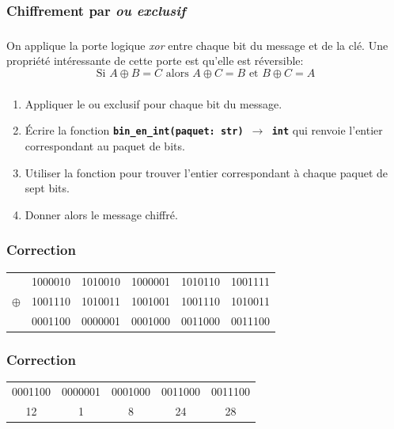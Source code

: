 \documentclass[svgnames,11pt]{beamer}
\begin{document}
\subsubsection{Chiffrement par \emph{ou exclusif}}
\begin{frame}
    \frametitle{}
    On applique la porte logique \emph{xor} entre chaque bit du message et de la clé. Une propriété intéressante de cette porte est qu'elle est réversible:
    $$\mbox{Si }A\oplus B = C \mbox{ alors } A\oplus C=B \mbox{ et }B\oplus C=A$$
    

\end{frame}

\begin{frame}
    \frametitle{}

    \begin{activite}
        \begin{enumerate}
            \item Appliquer le ou exclusif pour chaque bit du message.
            \item Écrire la fonction \textbf{\texttt{bin\_en\_int(paquet: str) $\rightarrow$ int}} qui renvoie l'entier correspondant au paquet de bits.
            \item Utiliser la fonction pour trouver l'entier correspondant à chaque paquet de sept bits.
            \item Donner alors le message chiffré.
        \end{enumerate}
        \end{activite}

\end{frame}
\begin{frame}
    \frametitle{Correction}

    \begin{center}
        \begin{tabular}{*{6}{c}}
            &1000010&1010010&1000001&1010110&1001111\\
            $\oplus$&1001110&1010011&1001001&1001110&1010011\\
            \hline
            &0001100&0000001&0001000&0011000&0011100\\
        \end{tabular}
    \end{center}


\end{frame}

\begin{frame}
    \frametitle{Correction}

    \begin{center}
        \begin{tabular}{*{5}{c}}
            0001100&0000001&0001000&0011000&0011100\\
            12&1&8&24&28\\
        \end{tabular}
    \end{center}
\end{frame}
\end{document}
